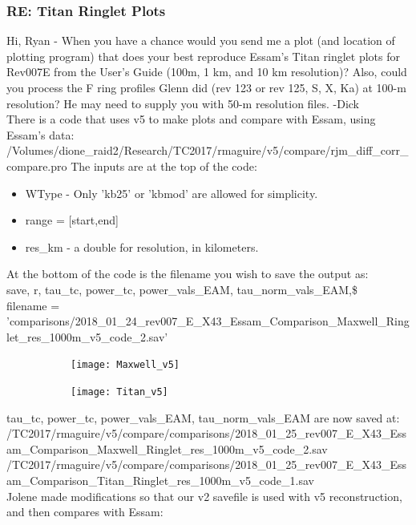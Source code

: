 \documentclass[crop=false,class=book]{standalone}
\begin{document}
\subsubsection{\footnotesize RE: Titan Ringlet Plots}
Hi, Ryan - When you have a chance would you send me a plot (and location of plotting program) that does your best reproduce Essam's Titan ringlet plots for Rev007E from the User's Guide (100m, 1 km, and 10 km resolution)? 
Also, could you process the F ring profiles Glenn did (rev 123 or rev 125, S, X, Ka) at 100-m resolution? He may need to supply you with 50-m resolution files. -Dick\\
There is a code that uses v5 to make plots and compare with Essam, using Essam's data:\\
/Volumes/dione\_raid2/Research/TC2017/rmaguire/v5/compare/rjm\_diff\_corr\_compare.pro
The inputs are at the top of the code:
\begin{itemize}
    \item WType - Only 'kb25' or 'kbmod' are allowed for simplicity.
    \item range = [start,end]
    \item res\_km - a double for resolution, in kilometers.
\end{itemize}
At the bottom of the code is the filename you wish to save the output as:\\
save, r, tau\_tc, power\_tc, power\_vals\_EAM, tau\_norm\_vals\_EAM,\$\\
filename = 'comparisons/2018\_01\_24\_rev007\_E\_X43\_Essam\_Comparison\_Maxwell\_Ringlet\_res\_1000m\_v5\_code\_2.sav'
\begin{figure}[H]
    \centering
    \begin{subfigure}[b]{0.49\textwidth}
        \texttt{[image: Maxwell\_v5]}
    \end{subfigure}
    \begin{subfigure}[b]{0.49\textwidth}
        \texttt{[image: Titan\_v5]}
    \end{subfigure}
\end{figure}
tau\_tc, power\_tc, power\_vals\_EAM, tau\_norm\_vals\_EAM are now saved at:\\
/TC2017/rmaguire/v5/compare/comparisons/2018\_01\_25\_rev007\_E\_X43\_Essam\_Comparison\_Maxwell\_Ringlet\_res\_1000m\_v5\_code\_2.sav\\
/TC2017/rmaguire/v5/compare/comparisons/2018\_01\_25\_rev007\_E\_X43\_Essam\_Comparison\_Titan\_Ringlet\_res\_1000m\_v5\_code\_1.sav\\
Jolene made modifications so that our v2 savefile is used with v5 reconstruction, and then compares with Essam:\\
\end{document}
